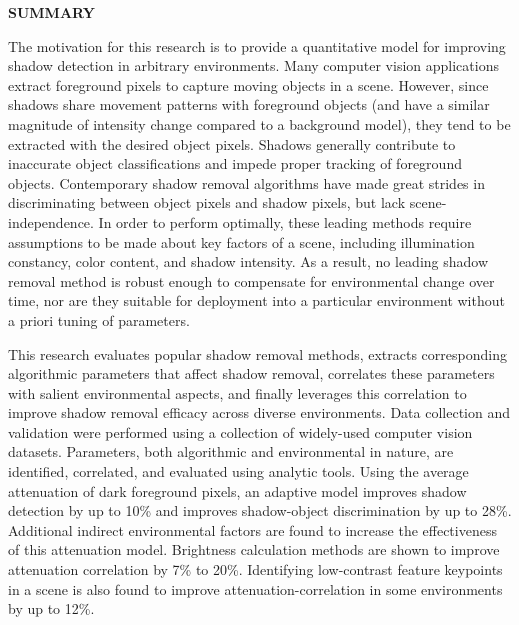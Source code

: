 \clearpage
\begin{centering}
\textbf{SUMMARY}\\
\vspace{\baselineskip}
\end{centering}

The motivation for this research is to provide a quantitative model for improving shadow detection in arbitrary environments. Many computer vision applications extract foreground pixels to capture moving objects in a scene. However, since shadows share movement patterns with foreground objects (and have a similar magnitude of intensity change compared to a background model), they tend to be extracted with the desired object pixels. Shadows generally contribute to inaccurate object classifications and impede proper tracking of foreground objects. Contemporary shadow removal algorithms have made great strides in discriminating between object pixels and shadow pixels, but lack scene-independence. In order to perform optimally, these leading methods require assumptions to be made about key factors of a scene, including illumination constancy, color content, and shadow intensity. As a result, no leading shadow removal method is robust enough to compensate for environmental change over time, nor are they suitable for deployment into a particular environment without a priori tuning of parameters.

This research evaluates popular shadow removal methods, extracts corresponding algorithmic parameters that affect shadow removal, correlates these parameters with salient environmental aspects, and finally leverages this correlation to improve shadow removal efficacy across diverse environments. Data collection and validation were performed using a collection of widely-used computer vision datasets. Parameters, both algorithmic and environmental in nature, are identified, correlated, and evaluated using analytic tools. 
Using the average attenuation of dark foreground pixels, an adaptive model improves shadow detection by up to 10\% and improves shadow-object discrimination by up to 28\%. Additional indirect environmental factors are found to increase the effectiveness of this attenuation model. 
Brightness calculation methods are shown to improve attenuation correlation by 7\% to 20\%.
Identifying low-contrast feature keypoints in a scene is also found to improve attenuation-correlation in some environments by up to 12\%.

